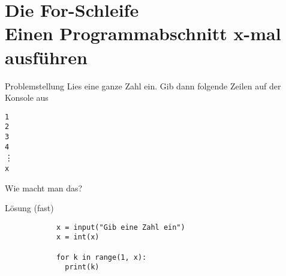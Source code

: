 \section{Die For-Schleife \\ \footnotesize Einen Programmabschnitt x-mal ausführen}




\begin{frame}

\begin{block}{Problemstellung}
\vspace{2pt}
Lies eine ganze Zahl  ein. Gib dann folgende Zeilen auf der Konsole aus 

\texttt{1}\\
\texttt{2}\\
\texttt{3}\\
\texttt{4}\\
\vdots \\
\texttt{x}

\vspace{12pt}
Wie macht man das? 

\end{block}
\end{frame}

\begin{fragile}{}
	\begin{block}{Lösung \footnotesize (fast)}
		\begin{verbatim}
			x = input("Gib eine Zahl ein")
			x = int(x)
			
			for k in range(1, x):	
			  print(k)
		\end{verbatim}
	\end{block}
\end{fragile}

